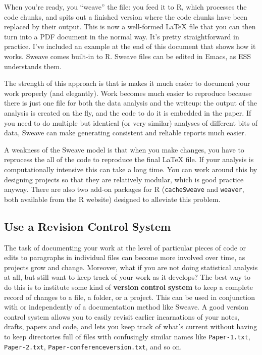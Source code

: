 \documentclass[11pt,article,oneside]{memoir}
\begin{document}
When you're ready, you ``weave'' the file: you feed it to R, which processes the code chunks, and spits out a finished version where the code chunks have been replaced by their output. This is now a well-formed LaTeX file that you can then turn into a PDF document in the normal way. It's pretty straightforward in practice. I've included an example at the end of this document that shows how it works. Sweave comes built-in to R. Sweave files can be edited in Emacs, as ESS understands them. 

The strength of this approach is that is makes it much easier to document your work properly (and elegantly). Work becomes much easier to reproduce because there is just one file for both the data analysis and the writeup: the output of the analysis is created on the fly, and the code to do it is embedded in the paper. If you need to do multiple but identical (or very similar) analyses of different bits of data, Sweave can make generating consistent and reliable reports much easier.

A weakness of the Sweave model is that when you make changes, you have to reprocess the all of the code to reproduce the final LaTeX file. If your analysis is computationally intensive this can take a long time. You can work around this by designing  projects so that they are relatively modular, which is good practice anyway. There are also two add-on packages for R (\texttt{cacheSweave} and \texttt{weaver}, both available from the R website) designed to alleviate this problem. 

\subsection{Use a Revision Control System}
The task of documenting your work at the level of particular pieces of code or edits to paragraphs in individual files can become more involved over time, as projects grow and change. Moreover, what if you are not doing statistical analysis at all, but still want to keep track of your work as it develops? The best way to do this is to institute some kind of \textbf{version} \textbf{control} \textbf{system} to keep a complete record of changes to a file, a folder, or a project. This can be used in conjunction with or independently of a documentation method like Sweave. A good version control system allows you to easily revisit earlier incarnations of your notes, drafts, papers and code, and lets you keep track of what's current without having to keep directories full of files with confusingly similar names like \texttt{Paper-1.txt}, \texttt{Paper-2.txt}, \texttt{Paper-conferenceversion.txt}, and so on. 
\end{document}
